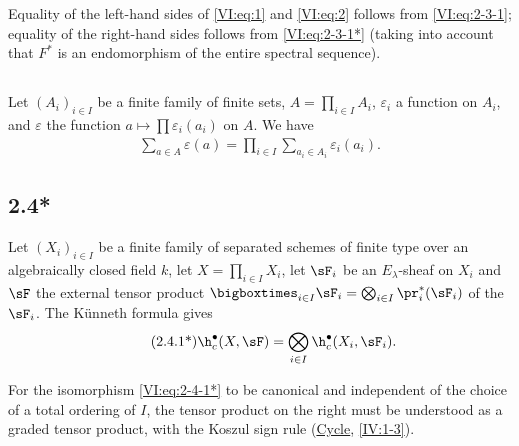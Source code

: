 \documentclass[oneside]{book}
\begin{document}
Equality of the left-hand sides of \eqref{VI:eq:1} and \eqref{VI:eq:2} 
follows from \eqref{VI:eq:2-3-1}; equality of the right-hand sides follows from 
\eqref{VI:eq:2-3-1*} (taking into account that $F^\ast$ is an endomorphism of 
the entire spectral sequence). 





\subsection{}\label{VI:2-4}

Let $(A_i)_{i\in I}$ be a finite family of finite sets, 
$A=\prod_{i\in I} A_i$, $\varepsilon_i$ a function on $A_i$, and 
$\varepsilon$ the function $a\mapsto \prod \varepsilon_i(a_i)$ on $A$. We have 
\begin{align*}\tag{2.4.1}\label{VI:eq:2-4-1}
  \sum_{a\in A} \varepsilon(a) = \prod_{i\in I} \sum_{a_i\in A_i} \varepsilon_i(a_i) \text{.}
\end{align*}





\subsection*{2.4*}\label{VI:2-4*}

Let $(X_i)_{i\in I}$ be a finite family of separated schemes of finite type 
over an algebraically closed field $k$, let $X=\prod_{i\in I} X_i$, let $\sF_i$ be an 
$E_\lambda$-sheaf on $X_i$ and $\sF$ the external tensor product 
$\bigboxtimes_{i\in I}\sF_i = \bigotimes_{i\in I} \pr_i^\ast(\sF_i)$ 
of the $\sF_i$. 
The K\"unneth formula gives 
\begin{align*}\tag{2.4.1*}\label{VI:eq:2-4-1*}
  \h_c^\bullet(X,\sF) = \bigotimes_{i\in I} \h_c^\bullet(X_i,\sF_i) \text{.}
\end{align*}

For the isomorphism \eqref{VI:eq:2-4-1*} to be canonical and independent of 
the choice of a total ordering of $I$, the tensor product on the right must be 
understood as a graded tensor product, with the Koszul sign rule 
(\hyperref[IV]{Cycle}, \ref{IV:1-3}). 





\subsection{}\label{VI:2-5}
\end{document}

